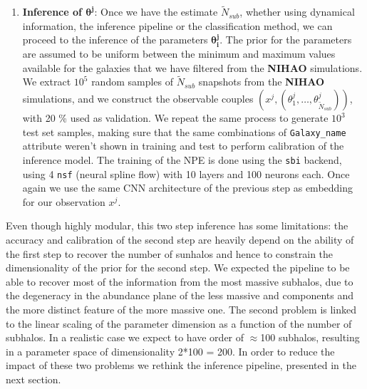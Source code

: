 \begin{enumerate}
    \item \textbf{Inference of $\mathbf{\theta^j}$}: Once we have the estimate $\tilde{N}_{sub}$, whether using dynamical information, the inference pipeline or the classification method, we can proceed to the inference of the parameters $\mathbf{\theta^j_i} $. The prior for the parameters are assumed to be uniform between the minimum and maximum values available for the galaxies that we have filtered from the \textbf{NIHAO} simulations. We extract $10^5$ random samples of $\tilde{N}_{sub}$ snapshots from the \textbf{NIHAO} simulations, and we construct the observable 
    couples $(x^j, (\theta_1^j, \dots, \theta_{\tilde{N}_{sub}}^j))$, with 20 \% used as validation. We repeat the same process to generate $10^3$ test set samples, making sure that the same combinations of \texttt{Galaxy\_name} attribute weren't shown in training and test to perform calibration of the inference model. The training of the NPE is done using the \texttt{sbi} backend, using 4 \texttt{nsf} (neural spline flow) with 10 layers and 100 neurons each. Once again we use the same CNN architecture of the previous step as embedding for our observation $x^j$.
\end{enumerate}
Even though highly modular, this two step inference has some limitations: the accuracy and calibration of the second step are heavily depend on the ability of the first step to recover the number of sunhalos and hence to constrain the dimensionality of the prior for the second step. We expected the pipeline to be able to recover most of the information from the most massive subhalos, due to the degeneracy in the abundance plane of the less massive and components and the more distinct feature of the more massive one. The second problem is linked to the linear scaling of the parameter dimension as a function of the number of subhalos. In a realistic case we expect to have order of $\approx$100 subhalos, resulting in a parameter space of dimensionality 2*100 = 200. In order to reduce the impact of these two problems we rethink the inference pipeline, presented in the next section.  


